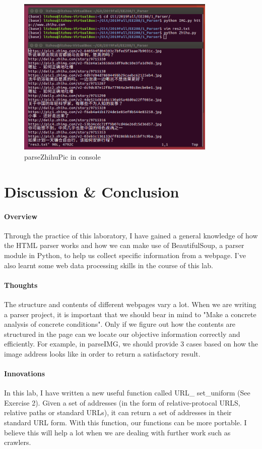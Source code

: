 \documentclass{article}
\begin{document}
\begin{figure}[htbp]
\centering
\includegraphics[width=9.5cm]{img/test3_2.png}
\caption{parseZhihuPic in console}
\label{img:3.2}
\end{figure}

\section{Discussion \& Conclusion}
\paragraph{Overview}
Through the practice of this laboratory, I have gained a general knowledge of how the HTML parser works and how we can make use of BeautifulSoup, a parser module in Python, to help us collect specific information from a webpage. I've also learnt some web data processing skills in the course of this lab.

\paragraph{Thoughts}
The structure and contents of different webpages vary a lot. When we are writing a parser project, it is important that we should bear in mind to "Make a concrete analysis of concrete conditions".  Only if we figure out how the contents are structured in the page can we locate our objective information correctly and efficiently. For example, in parseIMG, we should provide 3 cases based on how the image address looks like in order to return a satisfactory result.

\paragraph{Innovations}
In this lab, I have written a new useful function called URL\_ set\_uniform (See Exercise 2). Given a set of addresses (in the form of relative-protocal URLS, relative paths or standard URLs), it can return a set of addresses in their standard URL form. With this function, our functions can be more portable. I believe this will help a lot when we are dealing with further work such as crawlers.
\end{document}
